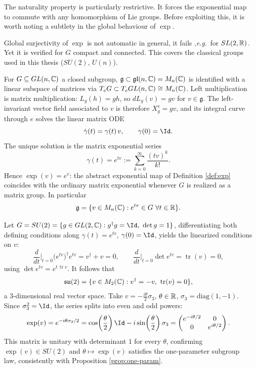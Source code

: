 The naturality property is particularly restrictive. It forces the exponential map to commute with any homomorphism of Lie groups. Before exploiting this, it is worth noting a subtlety in the global behaviour of $\exp$.

\begin{remark}
	Global surjectivity of $\exp$ is not automatic in general, it fails ,\textit{e.g.}\, for $SL(2,\mathbb{R})$. Yet it is verified for $G$ compact and connected. This covers the classical groups used in this thesis ($SU(2)$, $U(n)$).
\end{remark}

\begin{remark}
	For $G \subseteq GL(n,\mathbb{C})$ a closed subgroup, $\mathfrak g \subset \mathfrak{gl}(n,\mathbb{C}) = M_n(\mathbb{C})$ is identified with a linear subspace of matrices via $T_eG \subset T_eGL(n,\mathbb{C}) \cong M_n(\mathbb{C})$. Left multiplication is matrix multiplication: $L_g(h) = gh$, so $dL_g(v) = gv$ for $v \in \mathfrak g$. The left-invariant vector field associated to $v$ is therefore $X^v_g = gv$, and its integral curve through $e$ solves the linear matrix ODE
	\[
	\dot\gamma(t) = \gamma(t)\, v, \qquad \gamma(0) = \Id.
	\]
	The unique solution is the matrix exponential series
	\[
	\gamma(t) = e^{tv} := \sum_{k=0}^\infty \frac{(tv)^k}{k!}.
	\]
	Hence $\exp(v) = e^{v}$: the abstract exponential map of Definition \ref{def:exp} coincides with the ordinary matrix exponential whenever $G$ is realized as a matrix group. In particular
	\[
	\mathfrak g = \{v \in M_n(\C) : e^{tv} \in G \ \forall t \in \R\}.
	\]
\end{remark}

\begin{example}
	Let $G = SU(2) = \{g \in GL(2,\C) : g^\dagger g = \Id,\ \det g = 1\}$, differentiating both defining conditions along $\gamma(t) = e^{tv}$, $\gamma(0)= \Id$, yields the linearized conditions on $v$:
	\[
	\frac{d}{dt}\Big|_{t=0} \big(e^{tv}\big)^\dagger e^{tv} = v^\dagger + v = 0, \qquad
	\frac{d}{dt}\Big|_{t=0} \det e^{tv} = \operatorname{tr}(v) = 0,
	\]
	using $\det e^{tv} = e^{t\,\operatorname{tr} v}$. It follows that
	\[
	\mathfrak{su}(2) = \{v \in M_2(\mathbb{C}) : v^\dagger = -v,\ \operatorname{tr}(v) = 0\},
	\]
	a $3$-dimensional real vector space. Take $v = -\tfrac{i\theta}{2}\sigma_3$, $\theta \in \mathbb{R}$, $\sigma_3 = \mathrm{diag}(1,-1)$. Since $\sigma_3^2 = \Id$, the series splits into even and odd powers:
	\[
	\exp(v) = e^{-i\theta\sigma_3/2} = \cos\!\left(\frac{\theta}{2}\right) \Id - i\sin\!\left(\frac{\theta}{2}\right)\sigma_3
	= \begin{pmatrix} e^{-i\theta/2} & 0 \\ 0 & e^{i\theta/2} \end{pmatrix}.
	\]
	This matrix is unitary with determinant $1$ for every $\theta$, confirming $\exp(v) \in SU(2)$ and $\theta \mapsto \exp(v)$ satisfies the one-parameter subgroup law, consistently with Proposition \ref{prop:one-param}. 
\end{example}


